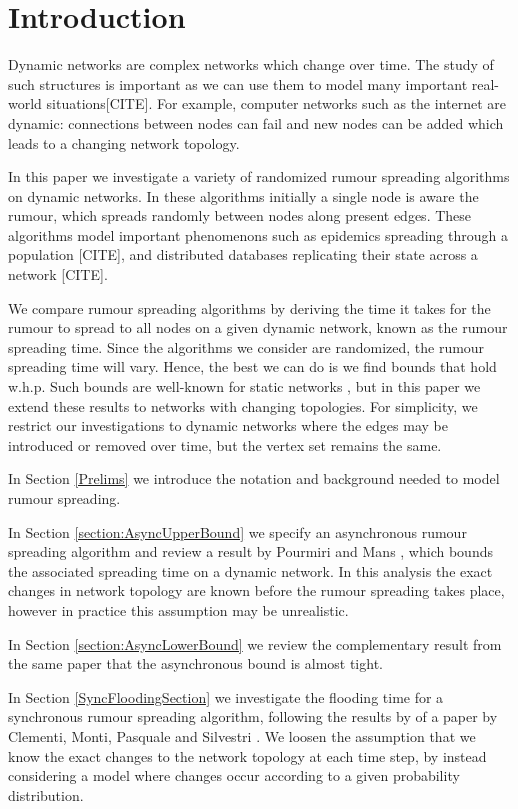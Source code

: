 \section{Introduction}

Dynamic networks are complex networks which change over time. The study of such structures is important as we can use them to model many important real-world situations[CITE]. For example, computer networks such as the internet are dynamic: connections between nodes can fail and new nodes can be added which leads to a changing network topology. 

In this paper we investigate a variety of randomized rumour spreading algorithms on dynamic networks. In these algorithms initially a single node is aware the rumour, which spreads randomly between nodes along present edges. These algorithms model important phenomenons such as epidemics spreading through a population [CITE], and distributed databases replicating their state across a network [CITE]. 

We compare rumour spreading algorithms by deriving the time it takes for the rumour to spread to all nodes on a given dynamic network, known as the rumour spreading time. Since the algorithms we consider are randomized, the rumour spreading time will vary. Hence, the best we can do is we find bounds that hold w.h.p. Such bounds are well-known for static networks \cite{complexNetworksRumourSpreading}, but in this paper we extend these results to networks with changing topologies. For simplicity, we restrict our investigations to dynamic networks where the edges may be introduced or removed over time, but the vertex set remains the same.

In Section \ref{Prelims} we introduce the notation and background needed to model rumour spreading.

In Section \ref{section:AsyncUpperBound} we specify an asynchronous rumour spreading algorithm and review a result by Pourmiri and Mans \cite{asyncPaper}, which bounds the associated spreading time on a dynamic network. In this analysis the exact changes in network topology are known before the rumour spreading takes place, however in practice this assumption may be unrealistic.

In Section \ref{section:AsyncLowerBound} we review the complementary result from the same paper \cite{asyncPaper} that the asynchronous bound is almost tight.

In Section \ref{SyncFloodingSection} we investigate the flooding time for a synchronous rumour spreading algorithm, following the results by of a paper by Clementi, Monti, Pasquale and Silvestri \cite{syncPaper}. We loosen the assumption that we know the exact changes to the network topology at each time step, by instead considering a model where changes occur according to a given probability distribution.

